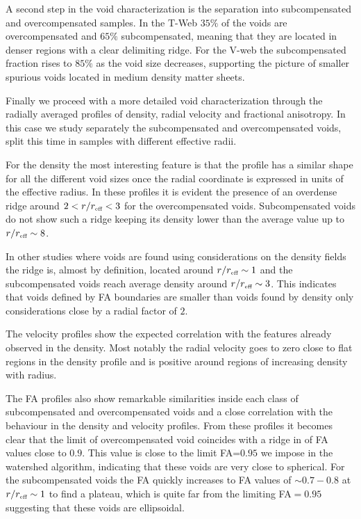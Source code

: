 \documentclass[a4,useAMS,usenatbib,usegraphicx]{mn2e}
\newcommand{\reff}{{\ifmmode{r_{\mbox{\tiny eff}}}\else{$r_{\mbox{\tiny eff}}$}\fi}}
\begin{document}
A second step in the void characterization 
is the separation into subcompensated and overcompensated samples. 
In the T-Web $35\%$ of the voids are overcompensated and $65\%$
subcompensated, meaning that they are located in denser regions with
a clear delimiting ridge.   
For the V-web the subcompensated fraction rises to $85\%$ as the
void size decreases, supporting the picture of smaller spurious voids
located in medium density matter sheets.   

Finally we proceed with a more detailed void characterization
through the radially averaged profiles of density, radial velocity and
fractional anisotropy. 
In this case we study separately the subcompensated and
overcompensated voids, split this time in samples with different
effective radii. 

For the density the most interesting feature is that the  profile has
a similar shape for all the different void sizes once the radial
coordinate is expressed in units of the effective radius.  
In these profiles it is evident the presence of an overdense ridge
around $2<r/\reff <3$ for the overcompensated voids.
Subcompensated voids do not show such a ridge keeping its density
lower than the average value up to $r/\reff \sim 8$.

In other studies where voids are found using considerations on the
density fields the ridge is, almost by definition, located around
$r/\reff \sim 1$ and the subcompensated voids reach average
density around $r/\reff \sim 3$. 
This indicates that voids defined by FA boundaries are smaller  than
voids found by density only considerations close by a radial factor of
$2$.   

The velocity profiles show the expected correlation with the features
already observed in the density.
Most notably the radial velocity goes to zero close to flat regions in
the density profile and is positive around regions of increasing
density with radius.  

The FA profiles also show remarkable similarities
inside each class of subcompensated and overcompensated voids
and a close correlation with the behaviour in the density and velocity
profiles. 
From these profiles it becomes clear that the limit of overcompensated
void coincides with a ridge in of FA values close to $0.9$. 
This value is close to the limit FA=$0.95$ we impose in the watershed
algorithm, indicating that these voids are very close to spherical.
For the subcompensated voids the FA quickly increases to FA values of 
$\sim 0.7-0.8$ at $r/\reff \sim 1$ to find a plateau, which is
quite far from the limiting FA$=0.95$ suggesting that these voids are
ellipsoidal. 
\end{document}
